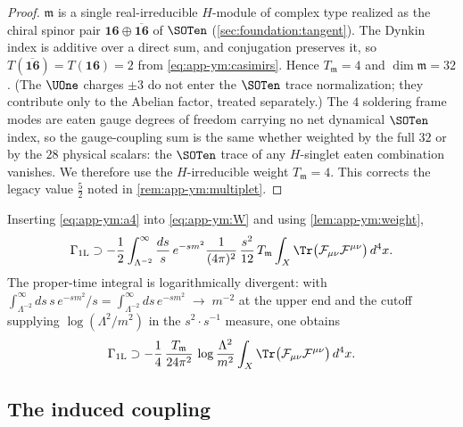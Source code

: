 \begin{proof}
$\mathfrak m$ is a single real-irreducible $H$-module of complex type
realized as the chiral spinor pair $\mathbf{16}\oplus
\overline{\mathbf{16}}$ of $\SOTen$
(\autoref{sec:foundation:tangent}). The Dynkin index is additive over a
direct sum, and conjugation preserves it, so
$T(\overline{\mathbf{16}})=T(\mathbf{16})=2$ from
\eqref{eq:app-ym:casimirs}. Hence $T_{\mathfrak m}=4$ and
$\dim\mathfrak m=32$. (The $\UOne$ charges $\pm3$ do not enter the
$\SOTen$ trace normalization; they contribute only to the Abelian
factor, treated separately.) The $4$ soldering frame modes are eaten
gauge degrees of freedom carrying no net dynamical $\SOTen$ index, so the
gauge-coupling sum is the same whether weighted by the full $32$ or by
the $28$ physical scalars: the $\SOTen$ trace of any $H$-singlet eaten
combination vanishes. We therefore use the $H$-irreducible weight
$T_{\mathfrak m}=4$. This corrects the legacy value $\tfrac52$ noted in
\autoref{rem:app-ym:multiplet}.
\end{proof}

Inserting \eqref{eq:app-ym:a4} into \eqref{eq:app-ym:W} and using
\autoref{lem:app-ym:weight},
\begin{equation}\label{eq:app-ym:insert}
  \Gamma_{\mathrm{1L}}
  \supset
  -\frac12\int_{\Lambda^{-2}}^{\infty}\frac{ds}{s}\,e^{-sm^{2}}
   \frac{1}{(4\pi)^{2}}\,\frac{s^{2}}{12}\,T_{\mathfrak m}
   \int_{X}\Tr\bigl(\mathcal F_{\mu\nu}\mathcal F^{\mu\nu}\bigr)\,d^{4}x .
\end{equation}
The proper-time integral is logarithmically divergent: with
$\int_{\Lambda^{-2}}^{\infty}ds\,s\,e^{-sm^{2}}/s
=\int_{\Lambda^{-2}}^{\infty}ds\,e^{-sm^{2}}
\;\to\;m^{-2}$ at the upper end and the cutoff supplying
$\log(\Lambda^{2}/m^{2})$ in the $s^{2}\!\cdot s^{-1}$ measure, one
obtains
\begin{equation}\label{eq:app-ym:log}
  \Gamma_{\mathrm{1L}}
  \supset
  -\frac14\,\frac{T_{\mathfrak m}}{24\pi^{2}}\,
   \log\frac{\Lambda^{2}}{m^{2}}
   \int_{X}\Tr\bigl(\mathcal F_{\mu\nu}\mathcal F^{\mu\nu}\bigr)\,d^{4}x .
\end{equation}

\subsection{The induced coupling}
\label{sec:app-ym:coupling}

